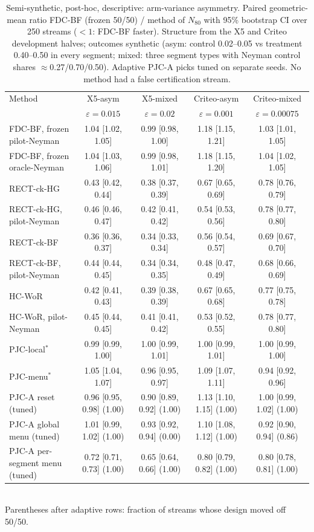 \begin{table}[t]
\centering\small
\setlength{\tabcolsep}{3pt}
\caption{Semi-synthetic, post-hoc, descriptive: arm-variance asymmetry. Paired geometric-mean ratio FDC-BF (frozen 50/50) / method of $N_{80}$ with 95\% bootstrap CI over 250 streams ($<1$: FDC-BF faster). Structure from the X5 and Criteo development halves; outcomes synthetic (asym: control 0.02--0.05 vs treatment 0.40--0.50 in every segment; mixed: three segment types with Neyman control shares $\approx$0.27/0.70/0.50). Adaptive PJC-A picks tuned on separate seeds. No method had a false certification stream.}
\label{tab:posthocF}
\begin{tabular}{lcccc}
\toprule
Method & X5-asym & X5-mixed & Criteo-asym & Criteo-mixed \\
 & $\varepsilon=0.015$ & $\varepsilon=0.02$ & $\varepsilon=0.001$ & $\varepsilon=0.00075$ \\
\midrule
FDC-BF, frozen pilot-Neyman & 1.04 [1.02, 1.05] & 0.99 [0.98, 1.00] & 1.18 [1.15, 1.21] & 1.03 [1.01, 1.05] \\
FDC-BF, frozen oracle-Neyman & 1.04 [1.03, 1.06] & 0.99 [0.98, 1.01] & 1.18 [1.15, 1.20] & 1.04 [1.02, 1.05] \\
RECT-ck-HG & 0.43 [0.42, 0.44] & 0.38 [0.37, 0.39] & 0.67 [0.65, 0.69] & 0.78 [0.76, 0.79] \\
RECT-ck-HG, pilot-Neyman & 0.46 [0.46, 0.47] & 0.42 [0.41, 0.42] & 0.54 [0.53, 0.56] & 0.78 [0.77, 0.80] \\
RECT-ck-BF & 0.36 [0.36, 0.37] & 0.34 [0.33, 0.34] & 0.56 [0.54, 0.57] & 0.69 [0.67, 0.70] \\
RECT-ck-BF, pilot-Neyman & 0.44 [0.44, 0.45] & 0.34 [0.34, 0.35] & 0.48 [0.47, 0.49] & 0.68 [0.66, 0.69] \\
HC-WoR & 0.42 [0.41, 0.43] & 0.39 [0.38, 0.39] & 0.67 [0.65, 0.68] & 0.77 [0.75, 0.78] \\
HC-WoR, pilot-Neyman & 0.45 [0.44, 0.45] & 0.41 [0.41, 0.42] & 0.53 [0.52, 0.55] & 0.78 [0.77, 0.80] \\
PJC-local$^*$ & 0.99 [0.99, 1.00] & 1.00 [0.99, 1.01] & 1.00 [0.99, 1.01] & 1.00 [0.99, 1.00] \\
PJC-menu$^*$ & 1.05 [1.04, 1.07] & 0.96 [0.95, 0.97] & 1.09 [1.07, 1.11] & 0.94 [0.92, 0.96] \\
\midrule
PJC-A reset (tuned) & 0.96 [0.95, 0.98] (1.00) & 0.90 [0.89, 0.92] (1.00) & 1.13 [1.10, 1.15] (1.00) & 1.00 [0.99, 1.02] (1.00) \\
PJC-A global menu (tuned) & 1.01 [0.99, 1.02] (1.00) & 0.93 [0.92, 0.94] (0.00) & 1.10 [1.08, 1.12] (1.00) & 0.92 [0.90, 0.94] (0.86) \\
PJC-A per-segment menu (tuned) & 0.72 [0.71, 0.73] (1.00) & 0.65 [0.64, 0.66] (1.00) & 0.80 [0.79, 0.82] (1.00) & 0.80 [0.78, 0.81] (1.00) \\
\bottomrule
\end{tabular}
\\[2pt]{\footnotesize Parentheses after adaptive rows: fraction of streams whose design moved off 50/50.}
\end{table}
